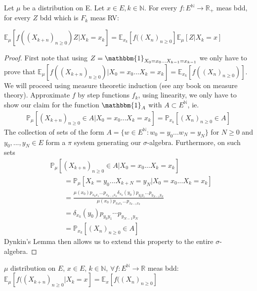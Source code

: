 \begin{theorem}
	Let $\mu$ be a distribution on E. Let $x \in E, k \in \mathbb{N}$. For every $f: E^{\mathbb{N}} \to \mathbb{R}_+$ meas bdd, for every $Z$ bdd which is $F_k$ meas RV:

	$\mathbb{E}_\mu \left[ f((X_{k+n})_{n \geq 0})Z | X_k = x_k \right] = \mathbb{E}_{x_k} \left[ f((X_n)_{n \geq 0} \right] \mathbb{E}_\mu \left[ Z | X_k=x \right] $
\end{theorem}
\begin{proof}
	First note that using $Z= \mathbbm{1}_{X_0=x_0...X_{k-1}=x_{k-1}}$ we only have to prove that \newline $\mathbb{E}_{\mu } \left[ f((X_{k+n})_{n\geq 0}) | X_0=x_0 ... X_k=x_k \right]= \mathbb{E}_{x_k} \left[ f((X_n)_{n\geq 0}) \right]$. We will proceed using measure theoretic induction (see any book on measure theory). Approximate $f$ by step functions $f_k$, using linearity, we only have to show our claim for the function $\mathbbm{1}_{A} $ with $A \subset E ^{\mathbb{N}}$, ie. 
	\begin{gather}
	\mathbb{P}_{\mu } \left[ (X_{k+n})_{n\geq 0}\in A | X_0=x_0...X_k=x_k \right] = \mathbb{P}_{x_k} \left[ (X_n)_{n\geq 0} \in A \right] 
\end{gather}  
The collection of sets of the form $A=\{w \in E^{\mathbb{N}}: w_0=y_0...w_N=y_N\}$ for $N\geq 0$ and $y_0,...,y_N \in E$ form a $\pi $ system generating our $\sigma$-algebra. Furthermore, on such sets 
\begin{align}
&	\mathbb{P}_{\mu } \left[ (X_{k+n})_{n\geq 0}\in A | X_0 = x_0...X_k=x_k \right] \\
&\qquad= \mathbb{P}_{\mu} \left[ X_k=y_0...X_{k+N}= y_N | X_0=x_0...X_k=x_k  \right] \\
&\qquad= \frac{\mu (x_0) p_{x_0x_1}...p_{x_{k-1}x_k} \delta_{x_k}(y_0)p_{y_0y_1}...p_{y_{N-1}y_N}}{\mu (x_0) p_{x_0x_1}...p_{x_{k-1}x_k} } \\
& \qquad= \delta_{x_k}(y_0)p_{y_0y_1} \cdots p_{y_{N-1}y_N} \\
& \qquad= \mathbb{P}_{x_k} \left[ (X_n)_{n\geq 0} \in A \right] 
\end{align}
Dynkin's Lemma then allows us to extend this property to the entire $\sigma$-algebra.
\end{proof}


\begin{cor}
	$\mu$ distribution on $E$, $x \in E$, $k \in \mathbb{N}$, $\forall f: E^{\mathbb{N}} \to \mathbb{R}$ meas bdd:
	$\mathbb{E}_\mu \left[ f((X_{k+n})_{n \geq 0} | X_k =x \right] = \mathbb{E} _x \left[ f((X_n)_{n \geq 0} \right]  $
\end{cor}

